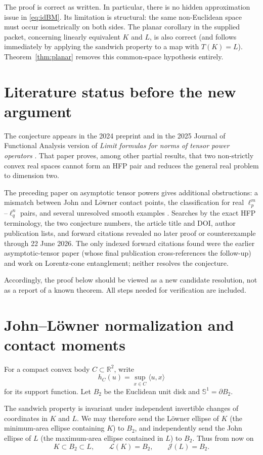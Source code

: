 \documentclass[11pt]{amsart}
\theoremstyle{definition}
\theoremstyle{remark}
\newcommand{\R}{\mathbb R}
\newcommand{\Sph}{\mathbb S^1}
\newcommand{\B}{B_2}
\newcommand{\Loew}{\mathcal L}
\newcommand{\John}{\mathcal J}
\newcommand{\ip}[2]{\langle #1,#2\rangle}
\begin{document}
The proof is correct as written.  In particular, there is no hidden
approximation issue in \eqref{eq:idBM}.  Its limitation is structural: the
same non-Euclidean space must occur isometrically on both sides.  The planar
corollary in the supplied packet, concerning linearly equivalent $K$ and $L$,
is also correct (and follows immediately by applying the sandwich property to
a map with $T(K)=L$).  Theorem~\ref{thm:planar} removes this common-space
hypothesis entirely.

\section{Literature status before the new argument}\label{sec:literature}

The conjecture appears in the 2024 preprint and in the 2025 Journal of
Functional Analysis version of \emph{Limit formulas for norms of tensor power
operators} \cite{AMH-limit}.  That paper proves, among other partial results,
that two non-strictly convex real spaces cannot form an HFP pair and reduces
the general real problem to dimension two.

The preceding paper on asymptotic tensor powers gives additional obstructions:
a mismatch between John and L\"owner contact points, the classification for
real $\ell_p^m$--$\ell_q^n$ pairs, and several unresolved smooth examples
\cite[Section 5.2]{AMH-asymptotic}.  Searches by the exact HFP terminology,
the two conjecture numbers, the article title and DOI, author publication
lists, and forward citations revealed no later proof or counterexample through
22 June 2026.  The only indexed forward citations found were the earlier
asymptotic-tensor paper (whose final publication cross-references the follow-up)
and work on Lorentz-cone entanglement; neither resolves the conjecture.

Accordingly, the proof below should be viewed as a new candidate resolution,
not as a report of a known theorem.  All steps needed for verification are
included.

\section{John--L\"owner normalization and contact moments}\label{sec:normal}

For a compact convex body $C\subset\R^2$, write
\[
 h_C(u)=\sup_{x\in C}\ip{u}{x}
\]
for its support function.  Let $\B$ be the Euclidean unit disk and
$\Sph=\partial\B$.

The sandwich property is invariant under independent invertible changes of
coordinates in $K$ and $L$.  We may therefore send the L\"owner ellipse of
$K$ (the minimum-area ellipse containing $K$) to $\B$, and independently send
the John ellipse of $L$ (the maximum-area ellipse contained in $L$) to $\B$.
Thus from now on
\begin{equation}\label{eq:normal}
 K\subset \B\subset L,
 \qquad \Loew(K)=\B,
 \qquad \John(L)=\B.
\end{equation}
\end{document}
